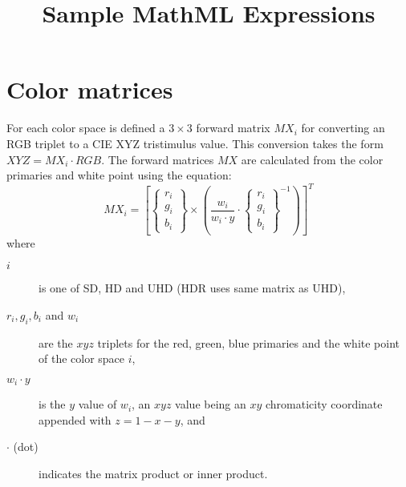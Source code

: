 \documentclass{article}
\begin{document}
\title{Sample MathML Expressions}
\maketitle

\section{Color matrices}

For each color space is defined a $3\times 3$ forward matrix $MX_i$
for converting an RGB triplet to a CIE XYZ tristimulus value.  This
conversion takes the form $XYZ = MX_i \cdot RGB$.  The forward
matrices $MX$ are calculated from the color primaries and white point
using the equation:
\[
MX_i =
\left[
  \begin{Bmatrix} r_i \\ g_i \\ b_i \end{Bmatrix}
  \times
  \left(
  \frac{w_i}{w_i \cdot y}
  \cdot
  \begin{Bmatrix} r_i \\ g_i \\ b_i \end{Bmatrix}^{-1}
  \right)
\right]^T
\]
where
\begin{description}
\item[\mdseries $i$]
  is one of SD, HD and UHD (HDR uses same matrix as UHD),
  
\item[\mdseries $r_i, g_i, b_i$ and $w_i$]

  are the $xyz$ triplets for the red, green, blue primaries and the
  white point of the color space $i$,
  
\item[\mdseries $w_i \cdot y$] is the $y$ value
  of $w_i$, an $xyz$ value being an $xy$ chromaticity coordinate
  appended with $z = 1 - x - y$, and

\item[\mdseries $\cdot$ (dot)]
  indicates the matrix product or inner product.
\end{description}
\end{document}
